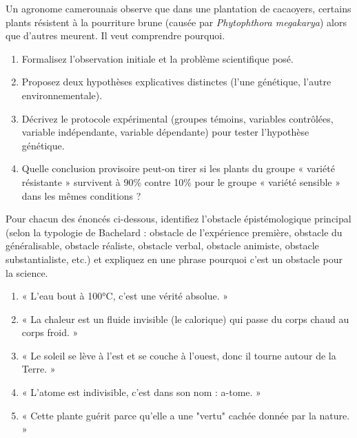 \documentclass[11pt]{article}
\newcommand{\cle}[1]{{\popxbold\color{popdark}#1}}
\begin{document}
\begin{exercice}
Un agronome camerounais observe que dans une plantation de cacaoyers, certains plants résistent à la pourriture brune (causée par \emph{Phytophthora megakarya}) alors que d'autres meurent. Il veut comprendre pourquoi.
\begin{enumerate}
    \item Formalisez l'\cle{observation} initiale et la \cle{problème} scientifique posé.
    \item Proposez deux \cle{hypothèses} explicatives distinctes (l'une génétique, l'autre environnementale).
    \item Décrivez le \cle{protocole expérimental} (groupes témoins, variables contrôlées, variable indépendante, variable dépendante) pour tester l'hypothèse génétique.
    \item Quelle \cle{conclusion} provisoire peut-on tirer si les plants du groupe « variété résistante » survivent à 90\% contre 10\% pour le groupe « variété sensible » dans les mêmes conditions ?
\end{enumerate}
\end{exercice}

\begin{exercice}
Pour chacun des énoncés ci-dessous, identifiez l'obstacle épistémologique principal (selon la typologie de Bachelard : obstacle de l'expérience première, obstacle du généralisable, obstacle réaliste, obstacle verbal, obstacle animiste, obstacle substantialiste, etc.) et expliquez en une phrase pourquoi c'est un obstacle pour la science.
\begin{enumerate}
    \item « L'eau bout à 100°C, c'est une vérité absolue. »
    \item « La chaleur est un fluide invisible (le calorique) qui passe du corps chaud au corps froid. »
    \item « Le soleil se lève à l'est et se couche à l'ouest, donc il tourne autour de la Terre. »
    \item « L'atome est indivisible, c'est dans son nom : a-tome. »
    \item « Cette plante guérit parce qu'elle a une "vertu" cachée donnée par la nature. »
\end{enumerate}
\end{exercice}
\end{document}
